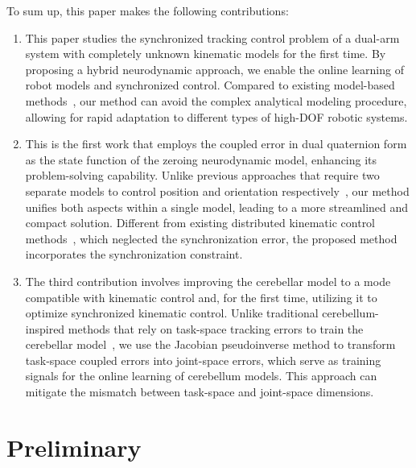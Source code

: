 \documentclass[journal,twoside,web]{ieeecolor}
\begin{document}
To sum up, this paper makes the following contributions:

\begin{enumerate}


\item This paper studies the synchronized tracking control problem of a dual-arm system with completely unknown kinematic models for the first time. By proposing a hybrid neurodynamic approach, we enable the online learning of robot models and synchronized control. Compared to existing model-based methods~\cite{Chen2020,Zhang2021TNNLS,Jia2020Robotica,Zhan2024TNNLS}, our method can avoid the complex analytical modeling procedure, allowing for rapid adaptation to different types of high-DOF robotic systems.

\item This is the first work that employs the coupled error in dual quaternion form as the state function of the zeroing neurodynamic model, enhancing its problem-solving capability. Unlike previous approaches that require two separate models to control position and orientation respectively~\cite{YANG2021108007,Li2024TII}, our method unifies both aspects within a single model, leading to a more streamlined and compact solution. Different from existing distributed kinematic control methods~\cite{Zhang2021TNNLS,Jia2020Robotica,Zhan2024TNNLS}, which neglected the synchronization error, the proposed method incorporates the synchronization constraint.

\item The third contribution involves improving the cerebellar model to a mode compatible with kinematic control and, for the first time, utilizing it to optimize synchronized kinematic control. Unlike traditional cerebellum-inspired methods that rely on task-space tracking errors to train the cerebellar model~\cite{Abadia2021,Capolei2020}, we use the Jacobian pseudoinverse method to transform task-space coupled errors into joint-space errors, which serve as training signals for the online learning of cerebellum models. This approach can mitigate the mismatch between task-space and joint-space dimensions.


\end{enumerate}



\section{Preliminary}\label{section:preliminary}
\end{document}
